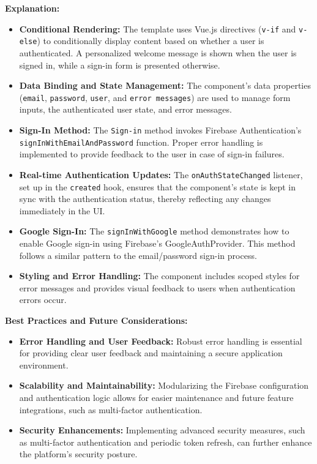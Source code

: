 \vspace{1em}
\textbf{Explanation:}
\begin{itemize}
    \item \textbf{Conditional Rendering:} The template uses Vue.js directives (\texttt{v-if} and \texttt{v-else}) to conditionally display content based on whether a user is authenticated. A personalized welcome message is shown when the user is signed in, while a sign-in form is presented otherwise.
    \item \textbf{Data Binding and State Management:} The component’s data properties (\texttt{email}, \texttt{password}, \texttt{user}, and \texttt{error messages}) are used to manage form inputs, the authenticated user state, and error messages.
    \item \textbf{Sign-In Method:} The \texttt{Sign-in} method invokes Firebase Authentication’s \texttt{signInWithEmailAndPassword} function. Proper error handling is implemented to provide feedback to the user in case of sign-in failures.
    \item \textbf{Real-time Authentication Updates:} The \texttt{onAuthStateChanged} listener, set up in the \texttt{created} hook, ensures that the component’s state is kept in sync with the authentication status, thereby reflecting any changes immediately in the UI.
    \item \textbf{Google Sign-In:} The \texttt{signInWithGoogle} method demonstrates how to enable Google sign-in using Firebase’s GoogleAuthProvider. This method follows a similar pattern to the email/password sign-in process.
    \item \textbf{Styling and Error Handling:} The component includes scoped styles for error messages and provides visual feedback to users when authentication errors occur.
\end{itemize}

\textbf{Best Practices and Future Considerations:}
\begin{itemize}
    \item \textbf{Error Handling and User Feedback:} Robust error handling is essential for providing clear user feedback and maintaining a secure application environment.
    \item \textbf{Scalability and Maintainability:} Modularizing the Firebase configuration and authentication logic allows for easier maintenance and future feature integrations, such as multi-factor authentication.
    \item \textbf{Security Enhancements:} Implementing advanced security measures, such as multi-factor authentication and periodic token refresh, can further enhance the platform’s security posture.
\end{itemize}

